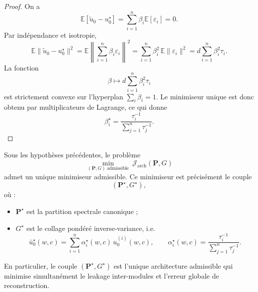 \begin{proof}
On a
\[
\mathbb E[\tilde u_0-u_0^\star]
=
\sum_{i=1}^n \beta_i\mathbb E[\varepsilon_i]
=
0.
\]
Par indépendance et isotropie,
\[
\mathbb E\|\tilde u_0-u_0^\star\|^2
=
\mathbb E\left\|\sum_{i=1}^n\beta_i\varepsilon_i\right\|^2
=
\sum_{i=1}^n\beta_i^2\,\mathbb E\|\varepsilon_i\|^2
=
d\sum_{i=1}^n\beta_i^2\tau_i.
\]
La fonction
\[
\beta\mapsto d\sum_{i=1}^n\beta_i^2\tau_i
\]
est strictement convexe sur l'hyperplan \(\sum_i\beta_i=1\).  
Le minimiseur unique est donc obtenu par multiplicateurs de Lagrange, ce qui donne
\[
\beta_i^\star
=
\frac{\tau_i^{-1}}{\sum_{j=1}^n\tau_j^{-1}}.
\]
\end{proof}

\begin{theorem}
Sous les hypothèses précédentes, le problème
\[
\min_{(\mathbf P,G)\ \mathrm{admissible}} \ \mathcal J_{\mathrm{arch}}(\mathbf P,G)
\]
admet un unique minimiseur admissible.
Ce minimiseur est précisément le couple
\[
(\mathbf P^\star,G^\star),
\]
où :

\begin{itemize}[leftmargin=2em]
    \item \(\mathbf P^\star\) est la partition spectrale canonique ;
    \item \(G^\star\) est le collage pondéré inverse-variance, i.e.
    \[
    \bar u_0^\star(w,c)
    =
    \sum_{i=1}^n \alpha_i^\star(w,c)\,u_0^{(i)}(w,c),
    \qquad
    \alpha_i^\star(w,c)
    =
    \frac{\tau_i^{-1}}{\sum_{j=1}^n \tau_j^{-1}}.
    \]
\end{itemize}

En particulier, le couple \((\mathbf P^\star,G^\star)\) est l'unique architecture admissible qui minimise simultanément le leakage inter-modules et l'erreur globale de reconstruction.
\end{theorem}

